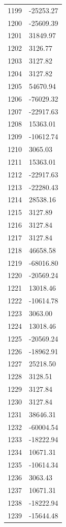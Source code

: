 \documentclass[a4paper,11pt]{article}
\begin{document}
\begin{center}
\begin{longtable}{|R{1.5cm}|R{2.5cm}|}
 1199 &    -25253.27 \\
 1200 &    -25609.39 \\
 1201 &     31849.97 \\
 1202 &      3126.77 \\
 1203 &      3127.82 \\
 1204 &      3127.82 \\
 1205 &     54670.94 \\
 1206 &    -76029.32 \\
 1207 &    -22917.63 \\
 1208 &     15363.01 \\
 1209 &    -10612.74 \\
 1210 &      3065.03 \\
 1211 &     15363.01 \\
 1212 &    -22917.63 \\
 1213 &    -22280.43 \\
 1214 &     28538.16 \\
 1215 &      3127.89 \\
 1216 &      3127.84 \\
 1217 &      3127.84 \\
 1218 &     46658.58 \\
 1219 &    -68016.80 \\
 1220 &    -20569.24 \\
 1221 &     13018.46 \\
 1222 &    -10614.78 \\
 1223 &      3063.00 \\
 1224 &     13018.46 \\
 1225 &    -20569.24 \\
 1226 &    -18962.91 \\
 1227 &     25218.50 \\
 1228 &      3128.51 \\
 1229 &      3127.84 \\
 1230 &      3127.84 \\
 1231 &     38646.31 \\
 1232 &    -60004.54 \\
 1233 &    -18222.94 \\
 1234 &     10671.31 \\
 1235 &    -10614.34 \\
 1236 &      3063.43 \\
 1237 &     10671.31 \\
 1238 &    -18222.94 \\
 1239 &    -15644.48 \\

\end{longtable}
\end{center}
\end{document}

